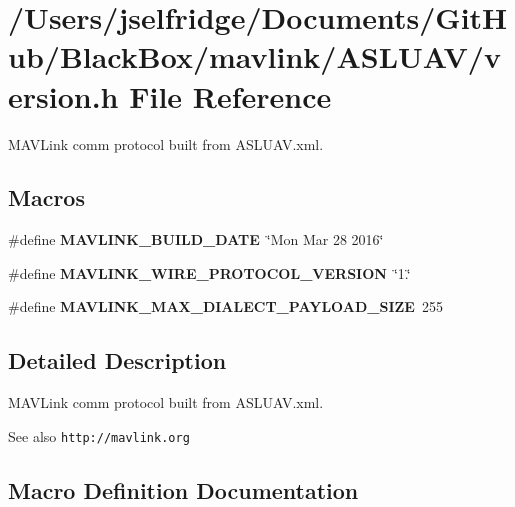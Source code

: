 \section{/\+Users/jselfridge/\+Documents/\+Git\+Hub/\+Black\+Box/mavlink/\+A\+S\+L\+U\+A\+V/version.h File Reference}
\label{_a_s_l_u_a_v_2version_8h}


M\+A\+V\+Link comm protocol built from A\+S\+L\+U\+A\+V.\+xml.  


\subsection*{Macros}
\begin{DoxyCompactItemize}
\item 
\#define \textbf{ M\+A\+V\+L\+I\+N\+K\+\_\+\+B\+U\+I\+L\+D\+\_\+\+D\+A\+TE}~\char`\"{}Mon Mar 28 2016\char`\"{}
\item 
\#define \textbf{ M\+A\+V\+L\+I\+N\+K\+\_\+\+W\+I\+R\+E\+\_\+\+P\+R\+O\+T\+O\+C\+O\+L\+\_\+\+V\+E\+R\+S\+I\+ON}~\char`\"{}1.\char`\"{}
\item 
\#define \textbf{ M\+A\+V\+L\+I\+N\+K\+\_\+\+M\+A\+X\+\_\+\+D\+I\+A\+L\+E\+C\+T\+\_\+\+P\+A\+Y\+L\+O\+A\+D\+\_\+\+S\+I\+ZE}~255
\end{DoxyCompactItemize}


\subsection{Detailed Description}
M\+A\+V\+Link comm protocol built from A\+S\+L\+U\+A\+V.\+xml. 

\begin{DoxySeeAlso}{See also}
{\tt http\+://mavlink.\+org} 
\end{DoxySeeAlso}


\subsection{Macro Definition Documentation}
\mbox{\label{_a_s_l_u_a_v_2version_8h_ab31250f0c93f71e42393b68a7cfe7585}} 
